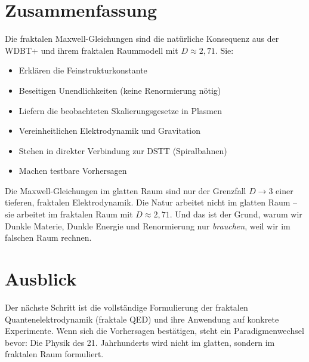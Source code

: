 \documentclass[12pt,a4paper]{article}
\begin{document}
\section{Zusammenfassung}

Die fraktalen Maxwell-Gleichungen sind die natürliche Konsequenz aus der WDBT+ und ihrem fraktalen Raummodell mit \(D \approx 2,71\). Sie:

\begin{itemize}
    \item Erklären die Feinstrukturkonstante
    \item Beseitigen Unendlichkeiten (keine Renormierung nötig)
    \item Liefern die beobachteten Skalierungsgesetze in Plasmen
    \item Vereinheitlichen Elektrodynamik und Gravitation
    \item Stehen in direkter Verbindung zur DSTT (Spiralbahnen)
    \item Machen testbare Vorhersagen
\end{itemize}

Die Maxwell-Gleichungen im glatten Raum sind nur der Grenzfall \(D \to 3\) einer tieferen, fraktalen Elektrodynamik. Die Natur arbeitet nicht im glatten Raum – sie arbeitet im fraktalen Raum mit \(D \approx 2,71\). Und das ist der Grund, warum wir Dunkle Materie, Dunkle Energie und Renormierung nur \textit{brauchen}, weil wir im falschen Raum rechnen.

\section*{Ausblick}

Der nächste Schritt ist die vollständige Formulierung der fraktalen Quantenelektrodynamik (fraktale QED) und ihre Anwendung auf konkrete Experimente. Wenn sich die Vorhersagen bestätigen, steht ein Paradigmenwechsel bevor: Die Physik des 21. Jahrhunderts wird nicht im glatten, sondern im fraktalen Raum formuliert.
\end{document}
